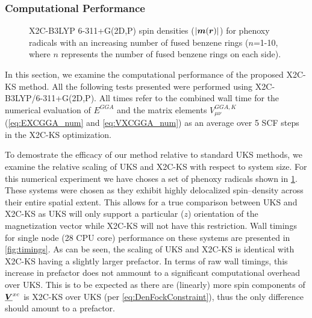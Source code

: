 \subsubsection{Computational Performance}

\begin{figure}
\begin{center}
\end{center}
\caption{X2C-B3LYP 6-311+G(2D,P) spin densities ($\vert\boldsymbol{m}(\boldsymbol{r})\vert$) for phenoxy radicals with an increasing number of fused benzene rings 
($n$=1-10, where $n$ represents the number of fused benzene rings on each side).}
\label{fig:radicals}       
\end{figure}

In this section, we examine the computational performance of the proposed
X2C-KS method.  All the following tests presented were performed using
X2C-B3LYP/6-311+G(2D,P).  All times refer to the combined wall time for the
numerical evaluation of $ E^{GGA}$ and the matrix elements
$V^{GGA,K}_{\mu\nu}$ (\cref{eq:EXCGGA_num} and \cref{eq:VXCGGA_num}) as an
average over 5 SCF steps in the X2C-KS optimization.  

To demostrate the efficacy of our method relative to standard UKS methods,
we examine the relative scaling of UKS and X2C-KS with respect to system
size. For this numerical experiment we have choses a set of phenoxy radicals
shown in \cref{fig:radicals}. These systems were chosen as they exhibit highly
delocalized spin--density across their entire spatial extent. This allows for
a true comparison between UKS and X2C-KS as UKS will only support a particular
($z$) orientation of the magnetization vector while X2C-KS will not have this
restriction. Wall timings for single node (28 CPU core) performance on these systems are presented in \cref{fig:timings}.
As can be seen, the scaling of UKS and X2C-KS is identical with X2C-KS
having a slightly larger prefactor. In terms of raw wall timings, this increase in prefactor
does not ammount to a significant computational overhead over UKS. This is to be expected as there are (linearly)
more spin components of $\boldsymbol{\underline{V}}^{xc}$ is X2C-KS over UKS (per \cref{eq:DenFockConstraint}),
thus the only difference should amount to a prefactor.





